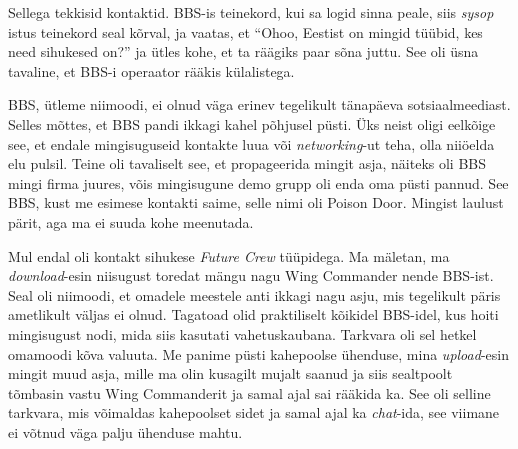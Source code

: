 Sellega tekkisid kontaktid. BBS-is teinekord, kui sa logid sinna peale, siis \emph{sysop} istus teinekord seal kõrval, ja vaatas, et \enquote{Ohoo,  Eestist on mingid tüübid, kes need sihukesed on?} ja ütles kohe, et ta räägiks paar sõna juttu. See oli üsna tavaline, et BBS-i operaator rääkis külalistega.

BBS, ütleme niimoodi, ei olnud väga erinev tegelikult tänapäeva sotsiaalmeediast. Selles mõttes, et BBS pandi ikkagi kahel põhjusel püsti. Üks neist oligi eelkõige see, et endale mingisuguseid kontakte luua või \emph{networking}-ut teha, olla niiöelda elu pulsil. Teine oli tavaliselt see, et propageerida mingit asja,  näiteks oli BBS mingi firma juures, võis mingisugune demo grupp oli enda oma püsti pannud. See BBS, kust me esimese kontakti saime, selle nimi oli Poison Door. Mingist laulust pärit, aga ma ei suuda kohe meenutada.

                 
Mul endal oli kontakt sihukese \emph{Future Crew} tüüpidega. Ma mäletan, ma \emph{download}-esin niisugust toredat mängu nagu Wing Commander nende BBS-ist. Seal oli niimoodi, et omadele meestele anti ikkagi nagu asju, mis tegelikult päris ametlikult väljas ei olnud. Tagatoad olid praktiliselt kõikidel BBS-idel, kus hoiti mingisugust nodi, mida siis kasutati vahetuskaubana. Tarkvara oli sel hetkel omamoodi kõva valuuta. Me panime püsti kahepoolse ühenduse, mina \emph{upload}-esin mingit muud asja, mille ma olin kusagilt mujalt saanud ja siis  sealtpoolt tõmbasin vastu Wing Commanderit ja samal ajal sai rääkida ka. See oli selline tarkvara, mis võimaldas kahepoolset sidet ja samal ajal ka \emph{chat}-ida, see viimane ei võtnud väga palju ühenduse mahtu.

